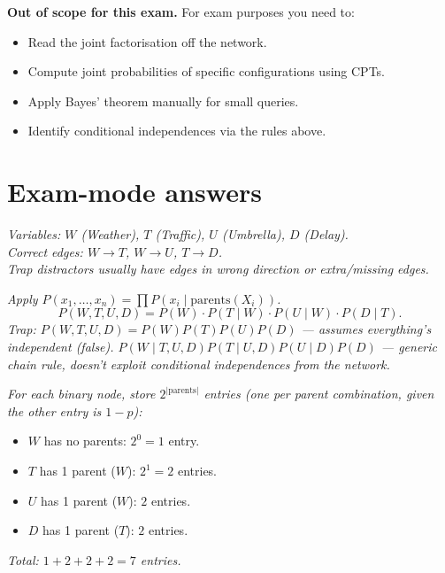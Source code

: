 \documentclass[11pt, a4paper]{article}
\begin{document}
\textbf{Out of scope for this exam.} For exam purposes you need to:
\begin{itemize}
  \item Read the joint factorisation off the network.
  \item Compute joint probabilities of specific configurations using CPTs.
  \item Apply Bayes' theorem manually for small queries.
  \item Identify conditional independences via the rules above.
\end{itemize}

\section{Exam-mode answers}

\begin{exambox}
\textit{Variables: $W$ (Weather), $T$ (Traffic), $U$ (Umbrella), $D$ (Delay).}\\[0.3em]
\textit{Correct edges: $W \to T$, $W \to U$, $T \to D$.}\\[0.3em]
\textit{Trap distractors usually have edges in wrong direction or extra/missing edges.}
\end{exambox}

\begin{exambox}
\textit{Apply $P(x_1, \dots, x_n) = \prod P(x_i \mid \mathrm{parents}(X_i))$.}
\[
P(W, T, U, D) = P(W) \cdot P(T \mid W) \cdot P(U \mid W) \cdot P(D \mid T).
\]
\textit{Trap: $P(W, T, U, D) = P(W) P(T) P(U) P(D)$ — assumes everything's independent (false). $P(W \mid T, U, D) P(T \mid U, D) P(U \mid D) P(D)$ — generic chain rule, doesn't exploit conditional independences from the network.}
\end{exambox}

\begin{exambox}
\textit{For each binary node, store $2^{|\mathrm{parents}|}$ entries (one per parent combination, given the other entry is $1 - p$):}
\begin{itemize}[leftmargin=*, itemsep=0pt, topsep=0pt]
  \item $W$ has no parents: $2^0 = 1$ entry.
  \item $T$ has 1 parent ($W$): $2^1 = 2$ entries.
  \item $U$ has 1 parent ($W$): $2$ entries.
  \item $D$ has 1 parent ($T$): $2$ entries.
\end{itemize}
\textit{Total: $1 + 2 + 2 + 2 = 7$ entries.}
\end{exambox}
\end{document}

